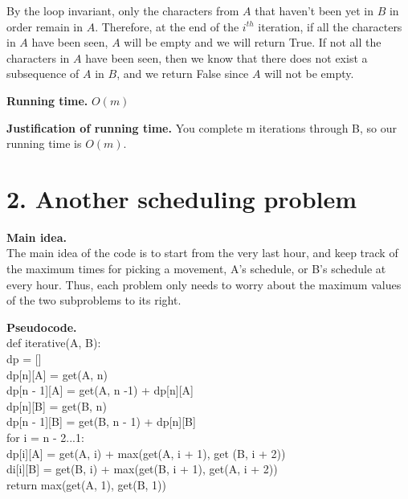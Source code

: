 \documentclass[11pt]{article}
\begin{document}
\noindent By the loop invariant, only the characters from $A$ that haven't been yet in $B$ in order remain in $A$.  Therefore, at the end of the $i^{th}$ iteration, if all the characters in $A$ have been seen, $A$ will be empty and we will return True.  If not all the characters in $A$ have been seen, then we know that there does not exist a subsequence of $A$ in $B$, and we return False since $A$ will not be empty.

\noindent
\textbf{Running time.}
$O(m)$


\noindent
\textbf{Justification of running time.}
You complete m iterations through B, so our running time is $O(m)$. 

\newpage
\section*{2. Another scheduling problem}
\noindent
\textbf{Main idea.}\\
The main idea of the code is to start from the very last hour, and keep track of the maximum times for picking a movement, A's schedule, or B's schedule at every hour.  Thus, each problem only needs to worry about the maximum values of the two subproblems to its right.


\noindent
\textbf{Pseudocode.} \\
def iterative(A, B): \\
\indent dp = [] \\
\indent dp[n][A] = get(A, n) \\
\indent dp[n - 1][A] = get(A, n -1) + dp[n][A] \\
\indent dp[n][B] = get(B, n) \\
\indent dp[n - 1][B] = get(B, n - 1) + dp[n][B] \\
\indent for i = n - 2...1: \\
\indent\indent dp[i][A] = get(A, i) + max(get(A, i + 1), get (B, i + 2)) \\
\indent\indent di[i][B] = get(B, i) + max(get(B, i + 1), get(A, i + 2)) \\
\indent return max(get(A, 1), get(B, 1)) \\
\end{document}
